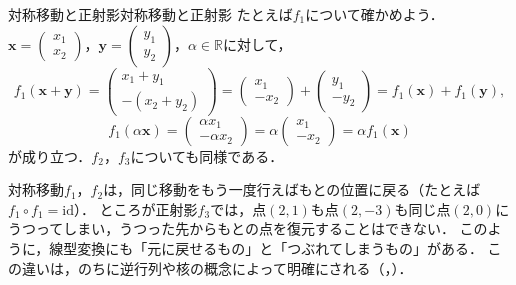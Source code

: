 \begin{example}{対称移動と正射影}{対称移動と正射影}
  たとえば$f_1$について確かめよう．
  $\bm{x} = \begin{pmatrix} x_1 \\ x_2 \end{pmatrix}$，$\bm{y} = \begin{pmatrix} y_1 \\ y_2 \end{pmatrix}$，$\alpha \in \mathbb{R}$に対して，
  \[
    f_1(\bm{x} + \bm{y})
    = \begin{pmatrix} x_1 + y_1 \\ -(x_2 + y_2) \end{pmatrix}
    = \begin{pmatrix} x_1 \\ -x_2 \end{pmatrix} + \begin{pmatrix} y_1 \\ -y_2 \end{pmatrix}
    = f_1(\bm{x}) + f_1(\bm{y}),
  \]
  \[
    f_1(\alpha\bm{x})
    = \begin{pmatrix} \alpha x_1 \\ -\alpha x_2 \end{pmatrix}
    = \alpha \begin{pmatrix} x_1 \\ -x_2 \end{pmatrix}
    = \alpha f_1(\bm{x})
  \]
  が成り立つ．$f_2$，$f_3$についても同様である．
\end{example}

対称移動$f_1$，$f_2$は，同じ移動をもう一度行えばもとの位置に戻る（たとえば$f_1 \circ f_1 = \mathrm{id}$）．
ところが正射影$f_3$では，点$(2, 1)$も点$(2, -3)$も同じ点$(2, 0)$にうつってしまい，うつった先からもとの点を復元することはできない．
このように，線型変換にも「元に戻せるもの」と「つぶれてしまうもの」がある．
この違いは，のちに逆行列や核の概念によって明確にされる（，）．

